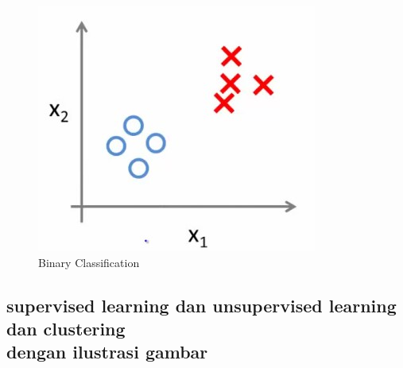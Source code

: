 \begin{figure}[ht]
\centering
\includegraphics[scale=0.5]{figures/f1.jpg}
\caption{Binary Classification}
\label{contoh}
\end{figure}

\subsection{supervised learning dan unsupervised learning dan clustering\\ dengan ilustrasi gambar}

